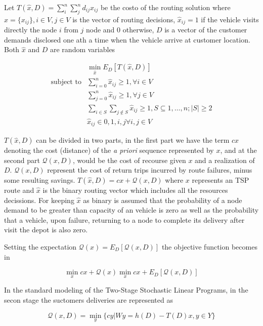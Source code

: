 Let $T(\hat{x},D) =\sum_i^n\sum_j^nd_{ij}x_{ij}$ be the costo of the routing solution where $\hat{x}=\{x_{ij}\},i\in V,j\in V$ is the vector of routing decisions, $\hat{x}_{ij} =1$ if the vehicle visits directly the node $i$ from $j$ node and $0$ otherwise, $D$ is a vector of the customer demands disclosed one ath a time when the vehicle arrive at customer location. Both $\hat{x}$ and $D$ are random variables

\begin{align}\label{eq:SPR}
  & \min\limits_{\hat{x}} E_D[T(\hat{x},D)]\\ 
 \text{subject to} & \sum_{i=0}^n\hat{x}_{ij} \geq 1, \forall i \in V\\
  & \sum_{j=0}^n\hat{x}_{ij} \geq 1, \forall j \in V\\
  & \sum_{i\in S}\sum_{j\notin S}\hat{x}_{ij} \geq 1, S\subseteq {1,\ldots,n};|S|\geq2\\
  & \hat{x}_{ij} \in {0,1}, i,j \forall i,j \in V
\end{align}

$T(\hat{x},D)$ can be divided in two parts, in the first part we have the term $cx$ denoting the cost (distance) of the \textit{a priori} sequence represented by $x$, and at the second part $\mathcal{Q}(x,D)$, would be the cost of recourse given $x$ and a realization of $D$. $\mathcal{Q}(x,D)$ represent the cost of return trips incurred by route failures, minus some resulting savings.
$T(\hat{x},D) = cx+\mathcal{Q}(x,D)$ where $x$ represents an TSP route and $\hat{x}$ is the binary routing vector which includes all the resources decissions. For keeping $\hat{x}$ as binary is assumed that the probability of a node demand to be greater than capacity of an vehicle is zero as well as the probability that a vehicle, upon failure, returning to a node to complete its delivery after visit the depot is also zero.

Setting the expectation $\mathcal{Q}(x) = E_D[\mathcal{Q}(x,D)]$ the objective function becomes in

\begin{equation}\label{eq:SPR_objective}
 \min\limits_x{cx+\mathcal{Q}(x)} \min\limits_x{cx+E_D[\mathcal{Q}(x,D)]}
\end{equation}

In the standard modeling of the Two-Stage Stochastic Linear Programs, in the secon stage the suctomers deliveries are represented as

\begin{equation}\label{eq:SPR_second_stage}
 \mathcal{Q}(x,D)=\min\limits_y\{cy|Wy=h(D)-T(D)x, y \in Y\}
\end{equation}

